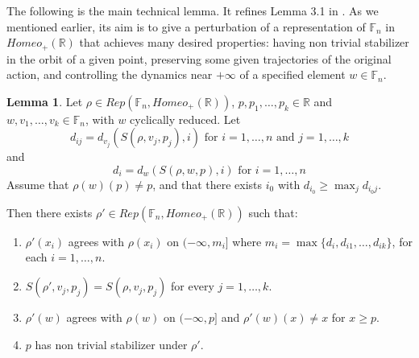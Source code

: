 \documentclass[12pt]{article}
\newcommand{\F}{\mathbb{F}}
\newcommand{\R}{\mathbb{R}}
\theoremstyle{definition}
\newtheorem{lem}[thm]{Lemma}
\newcommand{\vs}{\vspace{0.3cm}}
\begin{document}





The following is the main technical lemma. It refines Lemma 3.1 in \cite{abr}. As we mentioned earlier, its aim is to give a perturbation of a representation of $\F_n$ in $Homeo_{+}(\R)$ that achieves many desired properties: having non trivial stabilizer in the orbit of a given point, preserving some given trajectories of the original action, and controlling the dynamics near $+\infty$ of a specified element $w\in\F_n$.



\begin{lem}\label{tronco} Let $\rho\in Rep(\F_n,Homeo_{+}(\R))$, $p,p_1,\ldots,p_k\in\R$ and $w,v_1,\ldots,v_k\in\F_n$, with $w$ cyclically reduced. Let $$d_{ij} = d_{v_j}(S(\rho,v_j,p_j),i) \text{ for } i=1,\ldots,n \text{ and } j=1,\ldots,k$$ and $$d_i=d_w(S(\rho,w,p),i) \text{ for }  i=1,\ldots,n$$
Assume that $\rho(w)(p)\neq p$, and that there exists $i_0$ with $d_{i_0}\geq \max_j d_{i_0j}$.

\vs
 
 Then there exists $\rho'\in Rep(\F_n,Homeo_{+}(\R))$ such that:
\begin{enumerate}
\item $\rho'(x_i)$ agrees with $\rho(x_i)$ on $(-\infty,m_i]$ where $m_i=\max\{d_i,d_{i1},\ldots,d_{ik}\}$, for each $i=1,\ldots,n$.
\item $S(\rho',v_j,p_j)=S(\rho,v_j,p_j)$ for every $j=1,\ldots,k$.
\item $\rho'(w)$ agrees with $\rho(w)$ on $(-\infty,p]$ and $\rho'(w)(x)\neq x$ for $x\geq p$.
\item $p$ has non trivial stabilizer under $\rho'$.
\end{enumerate}
\end{lem} 
\end{document}
